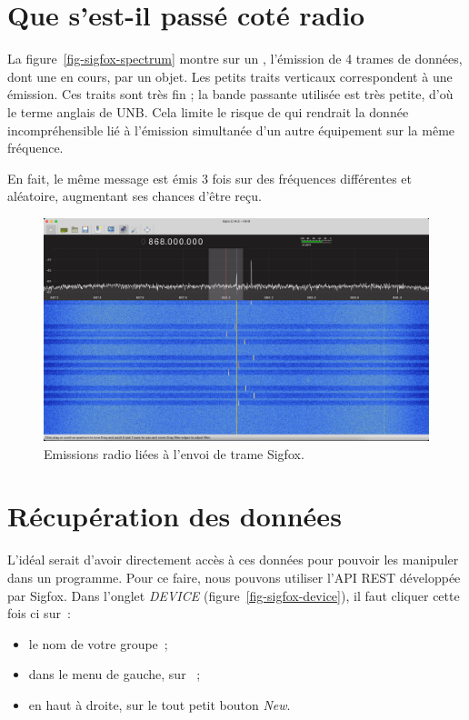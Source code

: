 \section{Que s'est-il passé coté radio}


La figure~\vref{fig-sigfox-spectrum} montre sur un , l'émission de 4 trames de données, dont une en cours, par un objet. Les petits traits verticaux correspondent à une émission. Ces traits sont très fin ; la bande passante utilisée est très petite, d'où le terme anglais de \ac{UNB}. Cela limite le risque de  qui rendrait la donnée incompréhensible lié à l'émission simultanée d'un autre équipement sur la même fréquence. 

En fait, le même message est émis 3 fois sur des fréquences différentes et aléatoire, augmentant ses chances d'être reçu. 

\begin{figure}[tbp]
\centerline{\includegraphics[width=1\columnwidth]{Pictures/sigfox-spectrum.png} }
\caption{Emissions radio liées à l'envoi de trame Sigfox.}
\label{fig-sigfox-spectrum}
\end{figure}

\section{Récupération des données}

\begin{figure}
\end{figure}


L'idéal serait d’avoir directement accès à ces données pour pouvoir les manipuler dans un programme. Pour ce faire, nous pouvons utiliser l’API REST développée par Sigfox.
Dans l’onglet \textit{DEVICE} (figure~\vref{fig-sigfox-device}), il faut cliquer cette fois ci sur~:
\begin{itemize}
    \item le nom de votre groupe~;
    \item dans le menu de gauche, sur ~;
    \item en haut à droite, sur le tout petit bouton \textit{New}.
\end{itemize}

